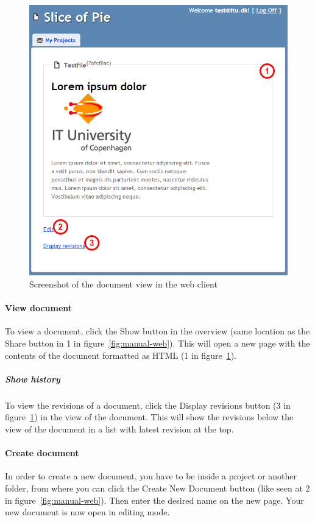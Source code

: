 	\begin{figure}[htb]
		\centering
		\includegraphics[width=1\textwidth]{User_manual/graphics/web-document.png}
		\caption{Screenshot of the document view in the web client}
		\label{fig:manual-web-document}
	\end{figure}

	\paragraph{View document}
	To view a document, click the Show button in the overview (same location as the Share button in 1 in figure~\ref{fig:manual-web}). This will open a new page with the contents of the document formatted as HTML (1 in figure~\ref{fig:manual-web-document}).
		
		\subparagraph{Show history}
		To view the revisions of a document, click the Display revisions button (3 in figure~\ref{fig:manual-web-document}) in the view of the document. This will show the revisions below the view of the document in a list with latest revision at the top.

	\paragraph{Create document}
	In order to create a new document, you have to be inside a project or another folder, from where you can click the Create New Document button (like seen at 2 in figure~\ref{fig:manual-web}). Then enter the desired name on the new page. Your new document is now open in editing mode.
	
